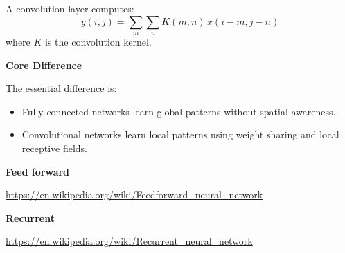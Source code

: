 \documentclass{book}
\providecommand{\ProjectDeepHeading}[2]{%
    \par\medskip\noindent\textbf{#2}\par\smallskip
}
\begin{document}
        A convolution layer computes:
        \[
            y(i,j) = \sum_{m}\sum_{n} K(m,n)\,x(i-m,j-n)
        \]
        where \( K \) is the convolution kernel.
        
        \ProjectDeepHeading{7}{Core Difference}
            
            The essential difference is:
            
            \begin{itemize}
                \item Fully connected networks learn global patterns without spatial awareness.
                \item Convolutional networks learn local patterns using weight sharing and local receptive fields.
            \end{itemize}
    

\ProjectDeepHeading{3}{Feed forward}


\url{https://en.wikipedia.org/wiki/Feedforward_neural_network}

\ProjectDeepHeading{3}{Recurrent}


\url{https://en.wikipedia.org/wiki/Recurrent_neural_network}





\end{document}
